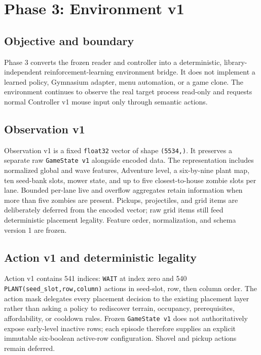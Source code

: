 \documentclass[11pt,a4paper]{article}
\begin{document}
\section{Phase 3: Environment v1}
\subsection{Objective and boundary}
Phase 3 converts the frozen reader and controller into a deterministic, library-independent reinforcement-learning environment bridge. It does not implement a learned policy, Gymnasium adapter, menu automation, or a game clone. The environment continues to observe the real target process read-only and requests normal Controller v1 mouse input only through semantic actions.

\subsection{Observation v1}
Observation v1 is a fixed \texttt{float32} vector of shape \texttt{(5534,)}. It preserves a separate raw \texttt{GameState v1} alongside encoded data. The representation includes normalized global and wave features, Adventure level, a six-by-nine plant map, ten seed-bank slots, mower state, and up to five closest-to-house zombie slots per lane. Bounded per-lane live and overflow aggregates retain information when more than five zombies are present. Pickups, projectiles, and grid items are deliberately deferred from the encoded vector; raw grid items still feed deterministic placement legality. Feature order, normalization, and schema version 1 are frozen.

\subsection{Action v1 and deterministic legality}
Action v1 contains 541 indices: \texttt{WAIT} at index zero and 540 \texttt{PLANT(seed\_slot,row,column)} actions in seed-slot, row, then column order. The action mask delegates every placement decision to the existing placement layer rather than asking a policy to rediscover terrain, occupancy, prerequisites, affordability, or cooldown rules. Frozen \texttt{GameState v1} does not authoritatively expose early-level inactive rows; each episode therefore supplies an explicit immutable six-boolean active-row configuration. Shovel and pickup actions remain deferred.
\end{document}
